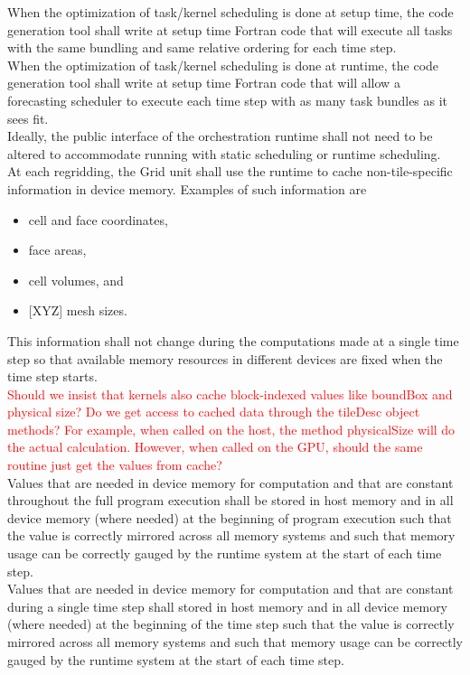 \documentclass{article}
\begin{document}
When the optimization of task/kernel scheduling is done at setup time, the 
code generation tool shall write at setup time Fortran code that will execute
all tasks with the same bundling and same relative ordering for each time
step.\\

When the optimization of task/kernel scheduling is done at runtime, the 
code generation tool shall write at setup time Fortran code that will allow a
forecasting scheduler to execute each time step with as many task bundles as it
sees fit.\\

Ideally, the public interface of the orchestration runtime shall not need to be
altered to accommodate running with static scheduling or runtime scheduling.\\

At each regridding, the Grid unit shall use the runtime to cache
non-tile-specific information in device memory.  Examples of such information
are
\begin{itemize}
\item{cell and face coordinates,}
\item{face areas, }
\item{cell volumes, and}
\item{[XYZ] mesh sizes.}
\end{itemize}
This information shall not change during the computations made at a single time
step so that available memory resources in different devices are fixed when the
time step starts.\\

\textcolor{red}{Should we insist that kernels also cache block-indexed values
like boundBox and physical size?  Do we get access to cached data through the
tileDesc object methods?  For example, when called on the host, the method
physicalSize will do the actual calculation.  However, when called on the GPU,
should the same routine just get the values from cache?}\\

Values that are needed in device memory for computation and that are constant
throughout the full program execution shall be stored in host memory and in all
device memory (where needed) at the beginning of program execution such that the
value is correctly mirrored across all memory systems and such that memory
usage can be correctly gauged by the runtime system at the start of each time
step.\\

Values that are needed in device memory for computation and that are constant
during a single time step shall stored in host memory and in all device memory
(where needed) at the beginning of the time step such that the value is
correctly mirrored across all memory systems and such that memory usage can be
correctly gauged by the runtime system at the start of each time step.
\end{document}
